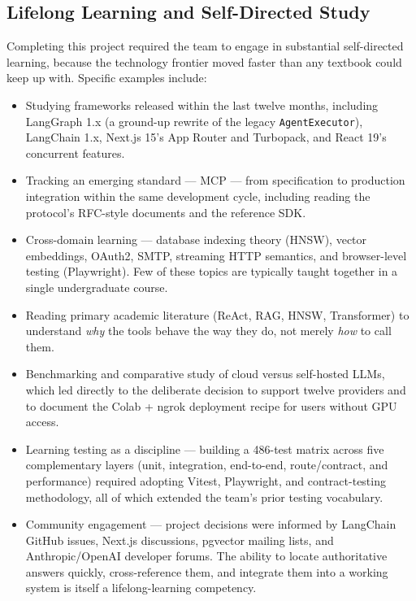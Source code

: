 \documentclass[11pt,a4paper]{report}
\newcommand{\code}[1]{\texttt{\small #1}}
\begin{document}
\subsection{Lifelong Learning and Self-Directed Study}

Completing this project required the team to engage in substantial
self-directed learning, because the technology frontier moved faster than
any textbook could keep up with. Specific examples include:

\begin{itemize}
  \item Studying frameworks released within the last twelve months, including LangGraph 1.x (a ground-up rewrite of the legacy \code{AgentExecutor}), LangChain 1.x, Next.js 15's App Router and Turbopack, and React 19's concurrent features.
  \item Tracking an emerging standard --- MCP --- from specification to production integration within the same development cycle, including reading the protocol's RFC-style documents and the reference SDK.
  \item Cross-domain learning --- database indexing theory (HNSW), vector embeddings, OAuth2, SMTP, streaming HTTP semantics, and browser-level testing (Playwright). Few of these topics are typically taught together in a single undergraduate course.
  \item Reading primary academic literature (ReAct, RAG, HNSW, Transformer) to understand \emph{why} the tools behave the way they do, not merely \emph{how} to call them.
  \item Benchmarking and comparative study of cloud versus self-hosted LLMs, which led directly to the deliberate decision to support twelve providers and to document the Colab + ngrok deployment recipe for users without GPU access.
  \item Learning testing as a discipline --- building a 486-test matrix across five complementary layers (unit, integration, end-to-end, route/contract, and performance) required adopting Vitest, Playwright, and contract-testing methodology, all of which extended the team's prior testing vocabulary.
  \item Community engagement --- project decisions were informed by LangChain GitHub issues, Next.js discussions, pgvector mailing lists, and Anthropic/OpenAI developer forums. The ability to locate authoritative answers quickly, cross-reference them, and integrate them into a working system is itself a lifelong-learning competency.
\end{itemize}
\end{document}
